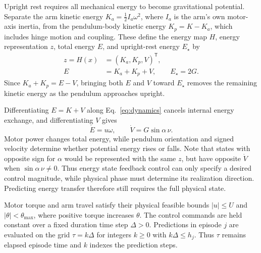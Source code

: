 \documentclass[letterpaper,10pt,conference]{ieeeconf}
\newcommand{\Estar}{E_{\star}}
\begin{document}
Upright rest requires all mechanical energy to become gravitational potential. Separate the arm kinetic energy $K_a=\tfrac12 I_a\omega^2$, where $I_a$ is the arm's own motor-axis inertia, from the pendulum-body kinetic energy $K_p=K-K_a$, which includes hinge motion and coupling. These define the energy map $H$, energy representation $z$, total energy $E$, and upright-rest energy $\Estar$ by
\begin{equation}
\begin{aligned}
 z=H(x)&=(K_a,K_p,V)^{\mathsf T},\\
 E&=K_a+K_p+V,\qquad \Estar=2G.
\end{aligned}
\label{eq:encoder}
\end{equation}
Since $K_a+K_p=E-V$, bringing both $E$ and $V$ toward $\Estar$ removes the remaining kinetic energy as the pendulum approaches upright.

Differentiating $E=K+V$ along Eq.~\eqref{eq:dynamics} cancels internal energy exchange, and differentiating $V$ gives
\begin{equation}
 \dot E=u\omega,\qquad \dot V=G\sin\alpha\,\nu.
\label{eq:powers}
\end{equation}
Motor power changes total energy, while pendulum orientation and signed velocity determine whether potential energy rises or falls. Note that states with opposite sign for $\alpha$ would be represented with the same $z$, but have opposite $\dot V$ when $\sin\alpha\,\nu\ne0$. Thus energy state feedback control can only specify a desired control magnitude, while physical phase must determine its realization direction.  Predicting energy transfer therefore still requires the full physical state.

Motor torque and arm travel satisfy their physical feasible bounds $|u|\le U$ and $|\theta|<\theta_{\max}$, where positive torque increases $\theta$. The control commands are held constant over a fixed duration time step $\Delta>0$. Predictions in episode $j$ are evaluated on the grid $\tau=k\Delta$ for integers $k\ge0$ with $k\Delta\le h_j$. Thus $\tau$ remains elapsed episode time and $k$ indexes the prediction steps.
\end{document}
